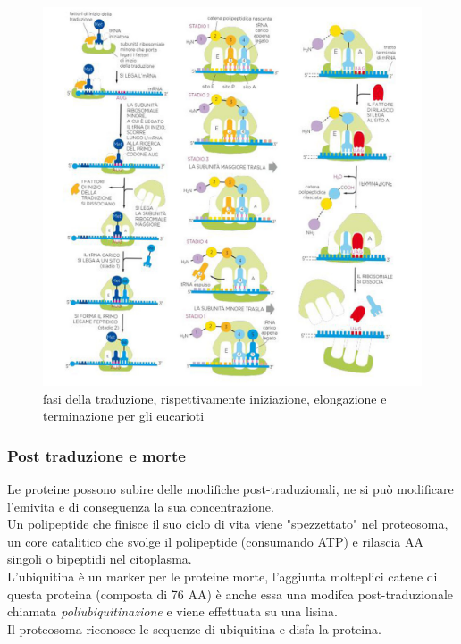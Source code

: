         \begin{figure}[h]
                \centering
                \includegraphics[width=1\textwidth]{images/traduzione.jpg}
                \caption{\small fasi della traduzione, rispettivamente iniziazione, elongazione e terminazione per gli eucarioti}
                \label{fig:mesh1}
        \end{figure}
        
        \subsubsection{Post traduzione e morte}
            Le proteine possono subire delle modifiche post-traduzionali, ne si può modificare l'emivita e di conseguenza la sua concentrazione. \\
            Un polipeptide che finisce il suo ciclo di vita viene "spezzettato" nel proteosoma, un core catalitico che svolge il polipeptide (consumando ATP) e rilascia AA singoli o bipeptidi nel citoplasma.\\
            L'ubiquitina è un marker per le proteine morte, l'aggiunta molteplici catene di questa proteina (composta di 76 AA) è anche essa una modifca post-traduzionale chiamata \textit{poliubiquitinazione} e viene effettuata su una lisina.\\
            Il proteosoma riconosce le sequenze di ubiquitina e disfa la proteina.

\pagebreak